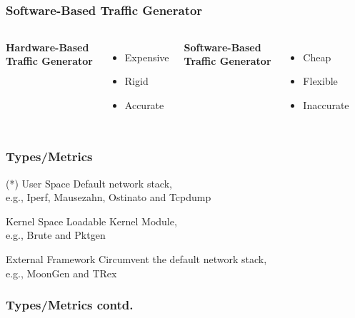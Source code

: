 \documentclass{beamer}
\begin{document}
\subsection{}
\begin{frame}
  \frametitle{Software-Based Traffic Generator}
  \begin{columns}[c] %
    \textbf{Hardware-Based \\ Traffic Generator}
    \begin{itemize}
      \item Expensive
      \item Rigid
      \item Accurate
    \end{itemize}

    \textbf{Software-Based \\ Traffic Generator}
    \begin{itemize}
      \item Cheap
      \item Flexible
      \item Inaccurate
    \end{itemize}
  \end{columns}
\end{frame}

\begin{frame}
  \frametitle{Types/Metrics}
  \begin{block}{(*) User Space}
    Default network stack, \\
    e.g., Iperf, Mausezahn, Ostinato and Tcpdump
  \end{block}

  \begin{block}{Kernel Space}
    Loadable Kernel Module, \\
    e.g., Brute and Pktgen
  \end{block}

  \begin{block}{External Framework}
    Circumvent the default network stack, \\
    e.g., MoonGen and TRex
  \end{block}
\end{frame}

\begin{frame}
  \frametitle{Types/Metrics contd.}
  
\end{frame}
\end{document}
